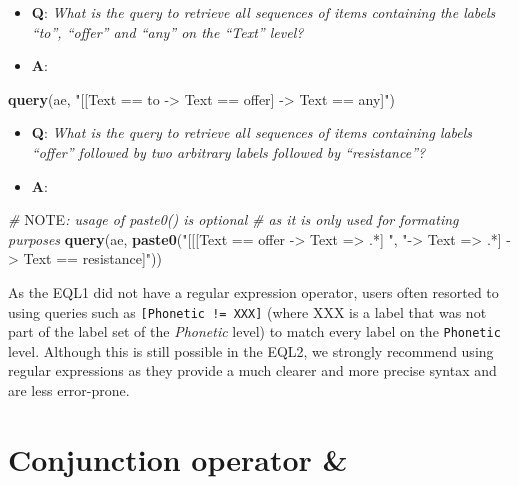 \documentclass[]{book}
\newenvironment{Shaded}{\begin{snugshade}}{\end{snugshade}}
\newcommand{\AlertTok}[1]{\textcolor[rgb]{0.94,0.16,0.16}{#1}}
\newcommand{\CommentTok}[1]{\textcolor[rgb]{0.56,0.35,0.01}{\textit{#1}}}
\newcommand{\KeywordTok}[1]{\textcolor[rgb]{0.13,0.29,0.53}{\textbf{#1}}}
\newcommand{\NormalTok}[1]{#1}
\newcommand{\StringTok}[1]{\textcolor[rgb]{0.31,0.60,0.02}{#1}}
\providecommand{\tightlist}{%
  \setlength{\itemsep}{0pt}\setlength{\parskip}{0pt}}
\begin{document}
\begin{itemize}
\tightlist
\item
  \textbf{Q}: \emph{What is the query to retrieve all sequences of items containing the labels ``to'', ``offer'' and ``any'' on the ``Text'' level?}
\item
  \textbf{A}:
\end{itemize}

\begin{Shaded}
\begin{Highlighting}[]
\KeywordTok{query}\NormalTok{(ae, }\StringTok{"[[Text == to -> Text == offer] -> Text == any]"}\NormalTok{)}
\end{Highlighting}
\end{Shaded}

\begin{itemize}
\tightlist
\item
  \textbf{Q}: \emph{What is the query to retrieve all sequences of items containing labels ``offer'' followed by two arbitrary labels followed by ``resistance''?}
\item
  \textbf{A}:
\end{itemize}

\begin{Shaded}
\begin{Highlighting}[]
\CommentTok{# }\AlertTok{NOTE}\CommentTok{: usage of paste0() is optional}
\CommentTok{# as it is only used for formating purposes}
\KeywordTok{query}\NormalTok{(ae, }\KeywordTok{paste0}\NormalTok{(}\StringTok{"[[[Text == offer -> Text => .*] "}\NormalTok{,}
                 \StringTok{"-> Text => .*] -> Text == resistance]"}\NormalTok{))}
\end{Highlighting}
\end{Shaded}

As the EQL1 did not have a regular expression operator, users often resorted to using queries such as \texttt{{[}Phonetic\ !=\ XXX{]}} (where XXX is a label that was not part of the label set of the \emph{Phonetic} level) to match every label on the \texttt{Phonetic} level. Although this is still possible in the EQL2, we strongly recommend using regular expressions as they provide a much clearer and more precise syntax and are less error-prone.

\hypertarget{conjunction-operator}{%
\section{Conjunction operator \&}\label{conjunction-operator}}
\end{document}
